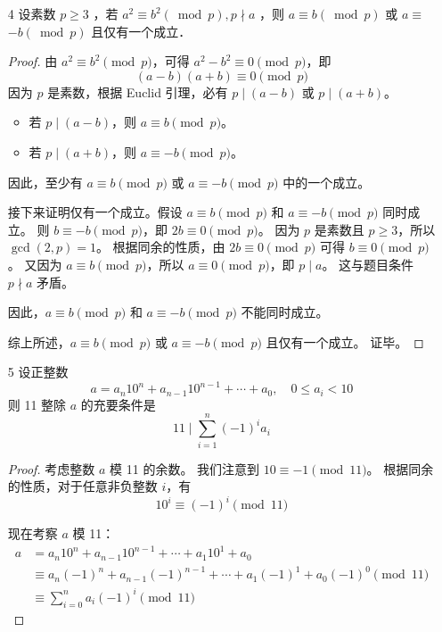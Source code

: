 \begin{enumerate}
\begin{proof}
        综上所述，两个同余式等价。
        证毕。
    \end{proof}
    \item[4] 设素数 $p \geqslant 3$ ，若 $a^2 \equiv b^2(\bmod p), p \nmid a$ ，则 $a \equiv b(\bmod p)$ 或 $a \equiv$ $-b(\bmod p)$ 且仅有一个成立．

    \begin{proof}
        由 $a^2 \equiv b^2 \pmod p$，可得 $a^2 - b^2 \equiv 0 \pmod p$，即
        \[ (a - b)(a + b) \equiv 0 \pmod p \]
        因为 $p$ 是素数，根据 Euclid 引理，必有 $p \mid (a - b)$ 或 $p \mid (a + b)$。
        \begin{itemize}
            \item 若 $p \mid (a - b)$，则 $a \equiv b \pmod p$。
            \item 若 $p \mid (a + b)$，则 $a \equiv -b \pmod p$。
        \end{itemize}
        因此，至少有 $a \equiv b \pmod p$ 或 $a \equiv -b \pmod p$ 中的一个成立。
        
        接下来证明仅有一个成立。假设 $a \equiv b \pmod p$ 和 $a \equiv -b \pmod p$ 同时成立。
        则 $b \equiv -b \pmod p$，即 $2b \equiv 0 \pmod p$。
        因为 $p$ 是素数且 $p \ge 3$，所以 $\gcd(2, p) = 1$。
        根据同余的性质，由 $2b \equiv 0 \pmod p$ 可得 $b \equiv 0 \pmod p$。
        又因为 $a \equiv b \pmod p$，所以 $a \equiv 0 \pmod p$，即 $p \mid a$。
        这与题目条件 $p \nmid a$ 矛盾。
        
        因此，$a \equiv b \pmod p$ 和 $a \equiv -b \pmod p$ 不能同时成立。
        
        综上所述，$a \equiv b \pmod p$ 或 $a \equiv -b \pmod p$ 且仅有一个成立。
        证毕。
    \end{proof}

    \item[5] 设正整数
    $$
    a=a_n 10^n+a_{n-1} 10^{n-1}+\cdots+a_0, \quad 0 \leqslant a_i<10
    $$
    则 11 整除 $a$ 的充要条件是
    $$
    11 \mid \sum_{i=1}^n(-1)^i a_i
    $$

    \begin{proof}
        考虑整数 $a$ 模 11 的余数。
        我们注意到 $10 \equiv -1 \pmod{11}$。
        根据同余的性质，对于任意非负整数 $i$，有
        \[ 10^i \equiv (-1)^i \pmod{11} \]
        
        现在考察 $a$ 模 11：
        \begin{align*}
            a &= a_n 10^n + a_{n-1} 10^{n-1} + \cdots + a_1 10^1 + a_0 \\
            &\equiv a_n (-1)^n + a_{n-1} (-1)^{n-1} + \cdots + a_1 (-1)^1 + a_0 (-1)^0 \pmod{11} \\
            &\equiv \sum_{i=0}^n a_i (-1)^i \pmod{11}
        \end{align*}
        

\end{proof}
\end{enumerate}
